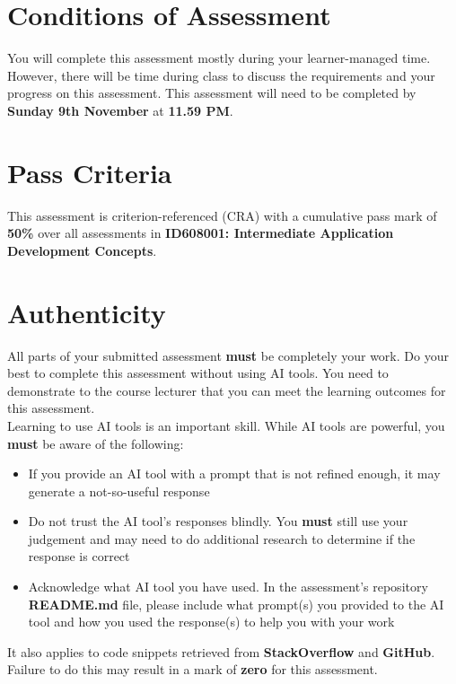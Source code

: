 \documentclass{article}
\begin{document}
\section*{Conditions of Assessment}
You will complete this assessment mostly during your learner-managed time. However, there will be time during class to discuss the requirements and your progress on this assessment. This assessment will need to be completed by \textbf{Sunday 9th November} at \textbf{11.59 PM}.

	\section*{Pass Criteria}
	This assessment is criterion-referenced (CRA) with a cumulative pass mark of \textbf{50\%}
	over all assessments in \textbf{ID608001: Intermediate Application Development
	Concepts}.

	\section*{Authenticity}
	All parts of your submitted assessment \textbf{must} be completely your work. Do your best to complete this assessment without using  AI tools. You need to demonstrate to the course lecturer that you can meet the learning outcomes for this assessment. \\
	
	Learning to use AI tools is an important skill. While AI tools are powerful, you \textbf{must} be aware of the following:

	\begin{itemize}
		\item If you provide an AI tool with a prompt that is not refined enough, it may generate a not-so-useful response
		\item Do not trust the AI tool's responses blindly. You \textbf{must} still use your judgement and may need to do additional research to determine if the response is correct
		\item Acknowledge what AI tool you have used. In the assessment's repository \textbf{README.md} file, please include what prompt(s) you provided to the AI tool and how you used the response(s) to help you with your work
	\end{itemize}

	It also applies to code snippets retrieved from \textbf{StackOverflow} and \textbf{GitHub}. \\
	
	Failure to do this may result in a mark of \textbf{zero} for this assessment.
\end{document}
